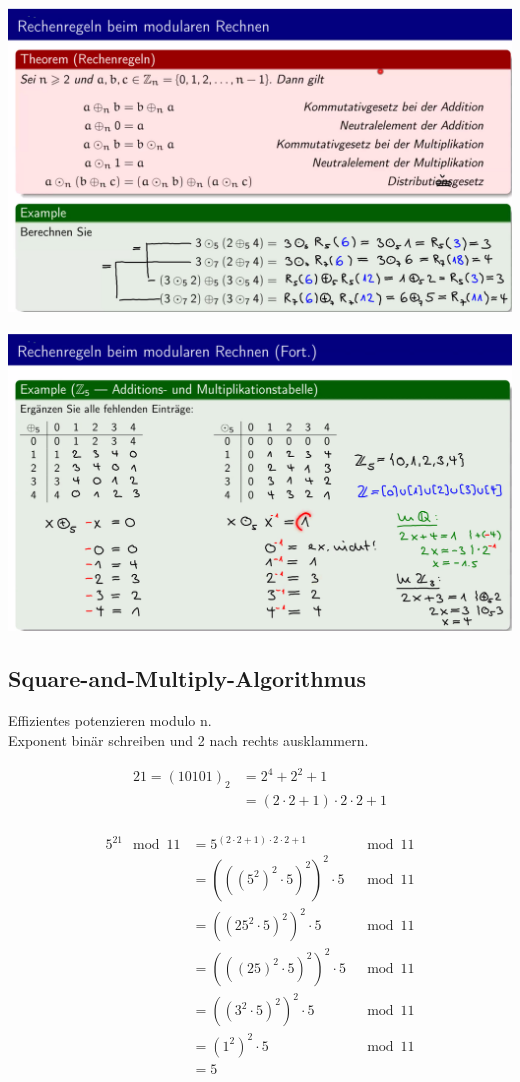\documentclass[12pt]{scrartcl}
\begin{document}
\vspace{0.5cm}

\includegraphics[width=14cm]{img/modulare_rechenregeln.png}

\includegraphics[width=14cm]{img/modulare_rechenregeln2.png}

\newpage
\subsection{Square-and-Multiply-Algorithmus}
Effizientes potenzieren modulo n.\\
Exponent binär schreiben und 2 nach rechts ausklammern.

\begin{align*}
    21 = (10101)_2  &= 2^4 + 2^2 + 1\\
                    &= (2 \cdot 2 + 1) \cdot 2 \cdot 2 + 1\\
\end{align*}

\begin{align*}
    5^{21} \mod 11  &= 5^{(2 \cdot 2 + 1) \cdot 2 \cdot 2 + 1} &\mod 11\\
    &= (((5^2)^2 \cdot 5)^2)^2 \cdot 5 &\mod 11\\
                    &= ((25^2 \cdot 5)^2)^2 \cdot 5 &\mod 11\\
                    &= (((25)^2 \cdot 5)^2)^2 \cdot 5 &\mod 11\\
                    &= ((3^2 \cdot 5)^2)^2 \cdot 5 &\mod 11\\
                    &= (1^2)^2 \cdot 5 &\mod 11\\
                    &= 5\\
                \end{align*}
                
\end{document}
